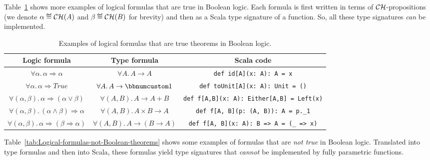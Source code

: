 Table~\ref{tab:Logical-formulas-Boolean-theorems} shows more examples
of logical formulas that are true in Boolean logic. Each formula is
first written in terms of ${\cal CH}$-propositions (we denote $\alpha\triangleq{\cal CH}(A)$
and $\beta\triangleq{\cal CH}(B)$ for brevity) and then as a Scala
type signature of a function. So, all these type signatures \emph{can}
be implemented.

\begin{table}[h]
\begin{centering}
\begin{tabular}{|c|c|c|}
\hline 
\textbf{\small{}Logic formula} & \textbf{\small{}Type formula} & \textbf{\small{}Scala code}\tabularnewline
\hline 
\hline 
{\footnotesize{}$\forall\alpha.\,\alpha\Rightarrow\alpha$} & {\footnotesize{}$\forall A.\,A\rightarrow A$} & \lstinline!def id[A](x: A): A = x!\tabularnewline
\hline 
{\footnotesize{}$\forall\alpha.\,\alpha\Rightarrow True$} & {\footnotesize{}$\forall A.\,A\rightarrow\bbnum 1$} & \lstinline!def toUnit[A](x: A): Unit = ()!\tabularnewline
\hline 
{\footnotesize{}$\forall(\alpha,\beta).\,\alpha\Rightarrow(\alpha\vee\beta)$} & {\footnotesize{}$\forall(A,B).\,A\rightarrow A+B$} & \lstinline!def f[A,B](x: A): Either[A,B] = Left(x)!\tabularnewline
\hline 
{\footnotesize{}$\forall(\alpha,\beta).\,(\alpha\wedge\beta)\Rightarrow\alpha$} & {\footnotesize{}$\forall(A,B).\,A\times B\rightarrow A$} & \lstinline!def f[A, B](p: (A, B)): A = p._1!\tabularnewline
\hline 
{\footnotesize{}$\forall(\alpha,\beta).\,\alpha\Rightarrow(\beta\Rightarrow\alpha)$} & {\footnotesize{}$\forall(A,B).\,A\rightarrow(B\rightarrow A)$} & \lstinline!def f[A, B](x: A): B => A = (_ => x)!\tabularnewline
\hline 
\end{tabular}
\par\end{centering}
\caption{Examples of logical formulas that are true theorems in Boolean logic.\label{tab:Logical-formulas-Boolean-theorems}}
\end{table}

Table~\ref{tab:Logical-formulas-not-Boolean-theorems} shows some
examples of formulas that are \emph{not true} in Boolean logic. Translated
into type formulas and then into Scala, these formulas yield type
signatures that \emph{cannot} be implemented by fully parametric functions.

